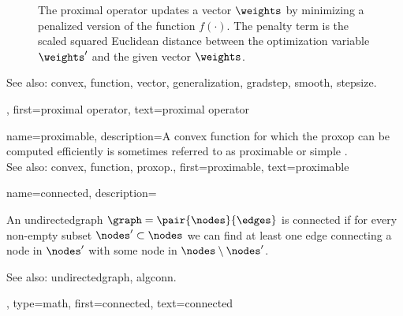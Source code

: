 {{\begin{figure}[H]
\begin{center}
\begin{tikzpicture}[scale=0.8]
				\end{tikzpicture}
			\end{center}
			\caption{The proximal operator updates a \gls{vector} $\weights$ by minimizing a penalized version 
				of the \gls{function} $f(\cdot)$. The penalty term is the scaled squared Euclidean distance between the optimization 
				variable $\weights'$ and the given \gls{vector} $\weights$.	\label{fig_proxoperator_opt_dict}}
		\end{figure}
		See also: \gls{convex}, \gls{function}, \gls{vector}, \gls{generalization}, \gls{gradstep}, \gls{smooth}, \gls{stepsize}.},
	first={proximal operator},
	text={proximal operator}
}

{name={proximable},
	description={A 
		\gls{convex} \gls{function} for which the \gls{proxop} can be computed efficiently is 
		sometimes referred to as proximable or simple \cite{Condat2013}.
					\\ 
		See also: \gls{convex}, \gls{function}, \gls{proxop}.},
	first={proximable},
	text={proximable}
}


{name={connected}, 
	description={An 
	    \gls{undirectedgraph} $\graph=\pair{\nodes}{\edges}$ is 
		connected if for every 
		non-empty subset $\nodes' \subset \nodes$ we can find at least one edge 
		connecting a node in $\nodes'$ with some node in $\nodes \setminus \nodes'$.
		\begin{figure}[H]
		\centering
\end{figure} 
		See also: \gls{undirectedgraph}, \gls{algconn}.}, 
	type=math, 
	first={connected},
	text={connected}
}
	
